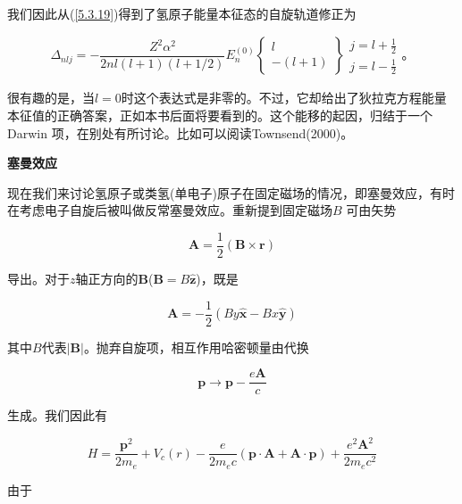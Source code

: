 ﻿\documentclass[UTF8,twoside]{ctexart}
\begin{document}
\noindent  我们因此从(\ref{5.3.19})得到了氢原子能量本征态的自旋轨道修正为

\begin{equation} \label{5.3.31}
\Delta_{nlj}=-\dfrac{Z^2\alpha^2}{2nl(l+1)(l+1/2)}E_n^{(0)}\left\{\begin{array}{c}
l \\
-(l+1)
\end{array}\right\}\begin{array}{c}
j=l+\frac{1}{2} \\
j=l-\frac{1}{2}
\end{array}\text{。}
\end{equation}

\noindent 很有趣的是，当$l=0$时这个表达式是非零的。不过，它却给出了狄拉克方程能量本征值的正确答案，正如本书后面将要看到的。这个能移的起因，归结于一个Darwin 项，在别处有所讨论。比如可以阅读Townsend(2000)。

\noindent \textbf{塞曼效应}

\noindent 现在我们来讨论氢原子或类氢(单电子)原子在固定磁场的情况，即塞曼效应，有时在考虑电子自旋后被叫做反常塞曼效应。重新提到固定磁场$B$ 可由矢势

\begin{equation} \label{5.3.32}
\boldsymbol{A}=\frac{1}{2}(\boldsymbol{B}\times\boldsymbol{r})
\end{equation}

\noindent 导出。对于$z$轴正方向的$\boldsymbol{B}$($\boldsymbol{B}=B\boldsymbol{\hat{z}}$)，既是

\begin{equation} \label{5.3.33}
\boldsymbol{A}=-\frac{1}{2}(By\boldsymbol{\hat{x}}-Bx\boldsymbol{\hat{y}})
\end{equation}

\noindent 其中$B$代表$|\boldsymbol{B}|$。抛弃自旋项，相互作用哈密顿量由代换

\begin{equation} \label{5.3.34}
\boldsymbol{p}\rightarrow\boldsymbol{p}-\dfrac{e\boldsymbol{A}}{c}
\end{equation}

\noindent 生成。我们因此有

\begin{equation} \label{5.3.35}
H=\dfrac{\boldsymbol{p}^2}{2m_e}+V_c(r)-\dfrac{e}{2m_ec} (\boldsymbol{p\cdot A}+\boldsymbol{A\cdot p})+\dfrac{e^2\boldsymbol{A}^2}{2m_ec^2}
\end{equation}

\noindent 由于
\end{document}
